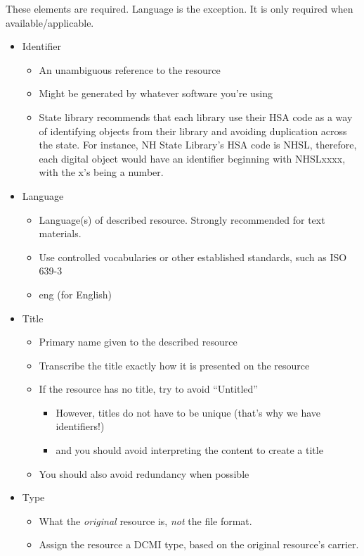 \documentclass[11pt]{article}
\begin{document}
These elements are required.
Language is the exception.
It is only required when available/applicable.
\begin{itemize}
\item Identifier
\label{sec:org88a5c85}
\begin{itemize}
\item An unambiguous reference to the resource
\item Might be generated by whatever software you're using
\item State library recommends that each library use their HSA code as a way of identifying objects from their library and avoiding duplication across the state. For instance, NH State Library’s HSA code is NHSL, therefore, each digital object would have an identifier beginning with NHSLxxxx, with the x’s being a number.
\end{itemize}
\item Language
\label{sec:org2893698}
\begin{itemize}
\item Language(s) of described resource. Strongly recommended for text materials.
\item Use controlled vocabularies or other established standards, such as ISO 639-3
\item eng (for English)
\end{itemize}
\item Title
\label{sec:orgca7841a}
\begin{itemize}
\item Primary name given to the described resource
\item Transcribe the title exactly how it is presented on the resource
\item If the resource has no title, try to avoid ``Untitled''
\begin{itemize}
\item However, titles do not have to be unique (that's why we have identifiers!)
\item and you should avoid interpreting the content to create a title
\end{itemize}
\item You should also avoid redundancy when possible
\end{itemize}
\item Type
\label{sec:orgdff4ec5}
\begin{itemize}
\item What the \emph{original} resource is, \emph{not} the file format.
\item Assign the resource a DCMI type, based on the original resource's carrier.

\end{itemize}
\end{itemize}
\end{document}
